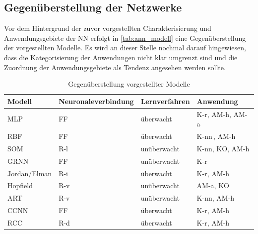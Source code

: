 \subsection{Gegenüberstellung der Netzwerke}

Vor dem Hintergrund der zuvor vorgestellten Charakterisierung und Anwendungsgebiete der NN erfolgt in \autoref{tab:ann_modell} eine Gegenüberstellung der vorgestellten Modelle. Es wird an dieser Stelle nochmal darauf hingewiesen, dass die Kategorisierung der Anwendungen nicht klar umgrenzt sind und die Zuordnung der Anwendungsgebiete als Tendenz angesehen werden sollte.

\begin{table}[h]
\caption{Gegenüberstellung vorgestellter Modelle}
\label{tab:ann_modell}
\begin{tabularx}{\textwidth}{llZZ}
\toprule
Modell          &  Neuronaleverbindung   & Lernverfahren          & Anwendung           \\
\midrule
MLP             & FF        & überwacht         & K-r, AM-h, AM-a                       \\
RBF             & FF        & überwacht         & K-nn\,\protect\footnotemark{}, AM-h   \\
SOM             & R-l       & unüberwacht       & K-nn, KO, AM-h                        \\
GRNN            & FF        & unüberwacht       & K-r                                   \\
Jordan/Elman    & R-i       & überwacht         & K-r, AM-h                             \\
Hopfield        & R-v       & unüberwacht       & AM-a, KO                              \\
ART             & R-v       & unüberwacht       & K-nn, AM-h                            \\
CCNN            & FF        & überwacht         & K-r, AM-h                             \\
RCC             & R-d       & überwacht         & K-r, AM-h                             \\


\bottomrule
\end{tabularx}
\end{table}
\addtocounter{footnote}{-1}     %
\addtocounter{Hfootnote}{-1}    %
\wrapfigfoot{}


